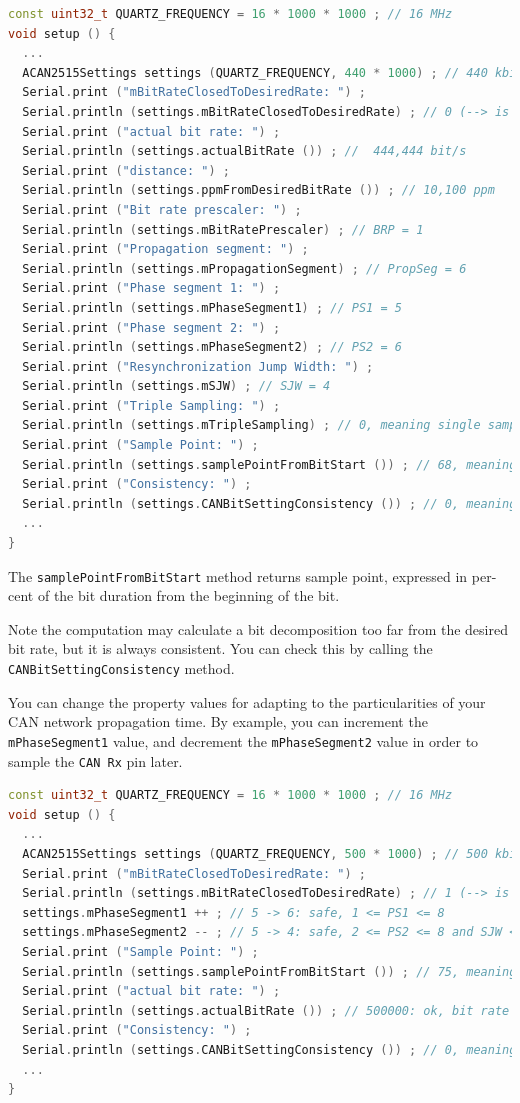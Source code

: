 \documentclass[10pt, a4paper, obeyspaces]{extarticle}
\begin{document}
{ \small\begin{lstlisting}[language=c++]
const uint32_t QUARTZ_FREQUENCY = 16 * 1000 * 1000 ; // 16 MHz
void setup () {
  ...
  ACAN2515Settings settings (QUARTZ_FREQUENCY, 440 * 1000) ; // 440 kbit/s 
  Serial.print ("mBitRateClosedToDesiredRate: ") ;
  Serial.println (settings.mBitRateClosedToDesiredRate) ; // 0 (--> is false)
  Serial.print ("actual bit rate: ") ;
  Serial.println (settings.actualBitRate ()) ; //  444,444 bit/s
  Serial.print ("distance: ") ;
  Serial.println (settings.ppmFromDesiredBitRate ()) ; // 10,100 ppm
  Serial.print ("Bit rate prescaler: ") ;
  Serial.println (settings.mBitRatePrescaler) ; // BRP = 1
  Serial.print ("Propagation segment: ") ;
  Serial.println (settings.mPropagationSegment) ; // PropSeg = 6
  Serial.print ("Phase segment 1: ") ;
  Serial.println (settings.mPhaseSegment1) ; // PS1 = 5
  Serial.print ("Phase segment 2: ") ;
  Serial.println (settings.mPhaseSegment2) ; // PS2 = 6
  Serial.print ("Resynchronization Jump Width: ") ;
  Serial.println (settings.mSJW) ; // SJW = 4
  Serial.print ("Triple Sampling: ") ;
  Serial.println (settings.mTripleSampling) ; // 0, meaning single sampling
  Serial.print ("Sample Point: ") ;
  Serial.println (settings.samplePointFromBitStart ()) ; // 68, meaning 68%
  Serial.print ("Consistency: ") ;
  Serial.println (settings.CANBitSettingConsistency ()) ; // 0, meaning Ok
  ...
}
\end{lstlisting}}

The \texttt{samplePointFromBitStart} method returns sample point, expressed in per-cent of the bit duration from the beginning of the bit.


Note the computation may calculate a bit decomposition too far from the desired bit rate, but it is always consistent. You can check this by calling the \texttt{CANBitSettingConsistency} method.

You can change the property values for adapting to the particularities of your CAN network propagation time. By example, you can increment the \texttt{mPhaseSegment1} value, and decrement the \texttt{mPhaseSegment2} value in order to sample the \texttt{CAN Rx} pin later.

{ \small\begin{lstlisting}[language=c++]
const uint32_t QUARTZ_FREQUENCY = 16 * 1000 * 1000 ; // 16 MHz
void setup () {
  ...
  ACAN2515Settings settings (QUARTZ_FREQUENCY, 500 * 1000) ; // 500 kbit/s
  Serial.print ("mBitRateClosedToDesiredRate: ") ;
  Serial.println (settings.mBitRateClosedToDesiredRate) ; // 1 (--> is true)
  settings.mPhaseSegment1 ++ ; // 5 -> 6: safe, 1 <= PS1 <= 8
  settings.mPhaseSegment2 -- ; // 5 -> 4: safe, 2 <= PS2 <= 8 and SJW <= PS2
  Serial.print ("Sample Point: ") ;
  Serial.println (settings.samplePointFromBitStart ()) ; // 75, meaning 75%
  Serial.print ("actual bit rate: ") ;
  Serial.println (settings.actualBitRate ()) ; // 500000: ok, bit rate did not change
  Serial.print ("Consistency: ") ;
  Serial.println (settings.CANBitSettingConsistency ()) ; // 0, meaning Ok
  ...
}
\end{lstlisting}}
\end{document}
